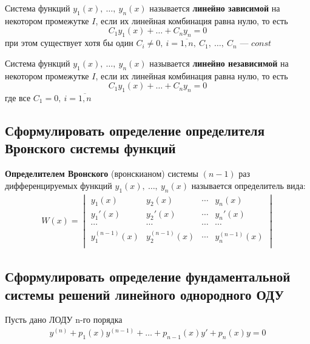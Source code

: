 \begin{definition*}
    Система функций $y_1(x),\ \ldots,\ y_n(x)$ называется \textbf{линейно зависимой} на некотором промежутке $I$, если их линейная комбинация равна нулю, то есть 
    \[
        C_1y_1(x) + \ldots + C_n y_n = 0
    \]
    при этом существует хотя бы один $C_i \ne 0,\ i = \overline{1,n},\ C_1,\ \ldots,\ C_n$ --- $const$
\end{definition*}

\begin{definition*}
    Система функций $y_1(x),\ \ldots,\ y_n(x)$ называется \textbf{линейно независимой} на некотором промежутке $I$, если их линейная комбинация равна нулю, то есть 
    \[
        C_1y_1(x) + \ldots + C_n y_n = 0
    \]
    где все $C_1 = 0,\ i = \overline{1,n}$
\end{definition*}

\subsection{Сформулировать определение определителя Вронского системы функций}

\begin{definition*}
    \textbf{Определителем Вронского} (вронскианом) системы $(n - 1)$ раз дифференцируемых функций $y_1 (x),\ \ldots,\ y_n(x)$ называется определитель вида:
    \begin{gather*}
        W (x) = \begin{vmatrix}
            y_1(x) & y_2(x) & \cdots & y_n(x) \\
            y_1'(x) & y_2'(x) & \cdots & y_n'(x) \\
            \cdots & \cdots & \cdots & \cdots \\
            y_1^{(n-1)}(x) & y_2^{(n-1)}(x) & \cdots & y_n^{(n-1)}(x) \\
        \end{vmatrix}
    \end{gather*}
\end{definition*}

\setcounter{equation}{0}
\subsection{Сформулировать определение фундаментальной системы решений линейного однородного ОДУ}

Пусть дано ЛОДУ n-го порядка
\begin{align}
    y^{(n)} + p_1(x) y^{(n-1)} + \ldots + p_{n-1}(x)y' + p_n(x)y = 0
\end{align}

